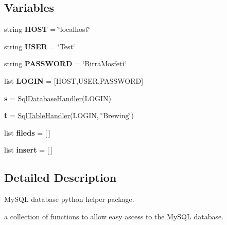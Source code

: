 \subsection*{Variables}
\begin{DoxyCompactItemize}
\item 
\mbox{\label{namespacesql_handler_a243b3aa79f1d4756bfc01fff9012311e}} 
string {\bfseries H\+O\+ST} = \char`\"{}localhost\char`\"{}
\item 
\mbox{\label{namespacesql_handler_a3b0cd0c908765607234eb0d1538ac30c}} 
string {\bfseries U\+S\+ER} = \char`\"{}Test\char`\"{}
\item 
\mbox{\label{namespacesql_handler_a810475f73aa009f81f5d2f49a0208173}} 
string {\bfseries P\+A\+S\+S\+W\+O\+RD} = \char`\"{}Birra\+Mosfeti\char`\"{}
\item 
\mbox{\label{namespacesql_handler_a581b3d376b0f29fa6154712e5c3e2449}} 
list {\bfseries L\+O\+G\+IN} = \mbox{[}H\+O\+ST,U\+S\+ER,P\+A\+S\+S\+W\+O\+RD\mbox{]}
\item 
\mbox{\label{namespacesql_handler_a81cda8a352f06399256ca8c7155d405b}} 
{\bfseries s} = \mbox{\hyperlink{classsql_handler_1_1_sql_database_handler}{Sql\+Database\+Handler}}(L\+O\+G\+IN)
\item 
\mbox{\label{namespacesql_handler_ae9b51af30a15c1ad4be5e1de4594e844}} 
{\bfseries t} = \mbox{\hyperlink{classsql_handler_1_1_sql_table_handler}{Sql\+Table\+Handler}}(L\+O\+G\+IN, \char`\"{}Brewing\char`\"{})
\item 
\mbox{\label{namespacesql_handler_a828b9869aabb34616db77852eac46ce8}} 
list {\bfseries fileds} = \mbox{[}$\,$\mbox{]}
\item 
\mbox{\label{namespacesql_handler_adbcc8fff9f7d9af0a4583f17baafe83f}} 
list {\bfseries insert} = \mbox{[}$\,$\mbox{]}
\end{DoxyCompactItemize}


\subsection{Detailed Description}
My\+S\+QL database python helper package. 

a collection of functions to allow easy ascess to the My\+S\+QL database. 